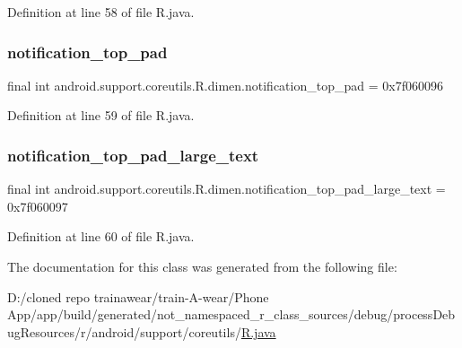 Definition at line 58 of file R.\+java.

\mbox{\label{classandroid_1_1support_1_1coreutils_1_1_r_1_1dimen_a4589b9bdbd19c78d9e8a4db2427f9774}} 
\subsubsection{\texorpdfstring{notification\_top\_pad}{notification\_top\_pad}}
{\footnotesize\ttfamily final int android.\+support.\+coreutils.\+R.\+dimen.\+notification\+\_\+top\+\_\+pad = 0x7f060096\hspace{0.3cm}{\ttfamily [static]}}



Definition at line 59 of file R.\+java.

\mbox{\label{classandroid_1_1support_1_1coreutils_1_1_r_1_1dimen_a2f62bb1b0cacaa1abbf10abacf232a24}} 
\subsubsection{\texorpdfstring{notification\_top\_pad\_large\_text}{notification\_top\_pad\_large\_text}}
{\footnotesize\ttfamily final int android.\+support.\+coreutils.\+R.\+dimen.\+notification\+\_\+top\+\_\+pad\+\_\+large\+\_\+text = 0x7f060097\hspace{0.3cm}{\ttfamily [static]}}



Definition at line 60 of file R.\+java.



The documentation for this class was generated from the following file\+:\begin{DoxyCompactItemize}
\item 
D\+:/cloned repo trainawear/train-\/\+A-\/wear/\+Phone App/app/build/generated/not\+\_\+namespaced\+\_\+r\+\_\+class\+\_\+sources/debug/process\+Debug\+Resources/r/android/support/coreutils/\mbox{\hyperlink{process_debug_resources_2r_2android_2support_2coreutils_2_r_8java}{R.\+java}}\end{DoxyCompactItemize}
